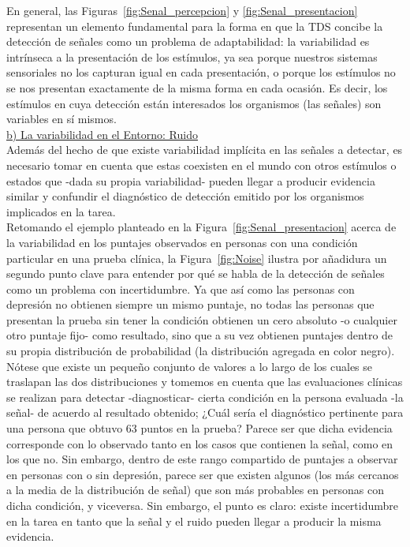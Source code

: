 En general, las Figuras~\ref{fig:Senal_percepcion} y \ref{fig:Senal_presentacion} representan un elemento fundamental para la forma en que la TDS concibe la detección de señales como un problema de adaptabilidad: la variabilidad es intrínseca a la presentación de los estímulos, ya sea porque nuestros sistemas sensoriales no los capturan igual en cada presentación, o porque los estímulos no se nos presentan exactamente de la misma forma en cada ocasión. Es decir, los estímulos en cuya detección están interesados los organismos (las señales) son variables en sí mismos.\\

    \underline{b) La variabilidad en el Entorno: Ruido}\\

Además del hecho de que existe variabilidad implícita en las señales a detectar, es necesario tomar en cuenta que estas coexisten en el mundo con otros estímulos o estados que -dada su propia variabilidad- pueden llegar a producir evidencia similar y confundir el diagnóstico de detección emitido por los organismos implicados en la tarea.\\

Retomando el ejemplo planteado en la Figura~\ref{fig:Senal_presentacion} acerca de la variabilidad en los puntajes observados en personas con una condición particular en una prueba clínica, la Figura~\ref{fig:Noise} ilustra por añadidura un segundo punto clave para entender por qué se habla de la detección de señales como un problema con incertidumbre. Ya que así como las personas con depresión no obtienen siempre un mismo puntaje, no todas las personas que presentan la prueba sin tener la condición obtienen un cero absoluto -o cualquier otro puntaje fijo- como resultado, sino que a su vez obtienen puntajes dentro de su propia distribución de probabilidad (la distribución agregada en color negro). Nótese que existe un pequeño conjunto de valores a lo largo de los cuales se traslapan las dos distribuciones y tomemos en cuenta que las evaluaciones clínicas se realizan para detectar -diagnosticar- cierta condición en la persona evaluada -la señal- de acuerdo al resultado obtenido; ¿Cuál sería el diagnóstico pertinente para una persona que obtuvo 63 puntos en la prueba? Parece ser que dicha evidencia corresponde con lo observado tanto en los casos que contienen la señal, como en los que no. Sin embargo, dentro de este rango compartido de puntajes a observar en personas con o sin depresión, parece ser que existen algunos (los más cercanos a la media de la distribución de señal) que son más probables en personas con dicha condición, y viceversa. Sin embargo, el punto es claro: existe incertidumbre en la tarea en tanto que la señal y el ruido pueden llegar a producir la misma evidencia.\\ 

